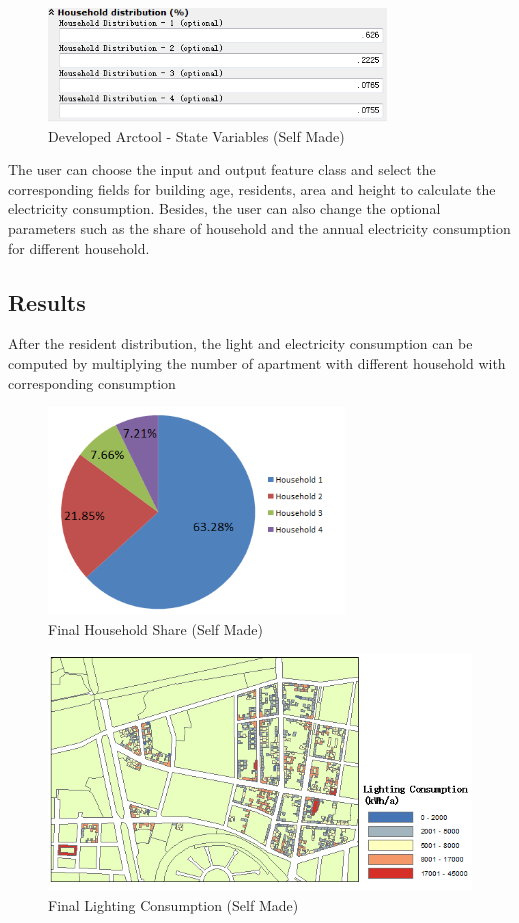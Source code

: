 \documentclass[11pt]{article}
\begin{document}
\begin{figure}[H]
	\centering
	\includegraphics[width=0.8\textwidth]{fig14.png}
	\caption{Developed Arctool - State Variables (Self Made)}
	\label{fig:figure14}
\end{figure}

The user can choose the input and output feature class and select the corresponding fields for building age, residents, area and height to calculate the electricity consumption. Besides, the user can also change the optional parameters such as the share of household and the annual electricity consumption for different household.

\subsection{Results}
After the resident distribution, the light and electricity consumption can be computed by multiplying the number of apartment with different household with corresponding consumption

\begin{figure}[ht]
	\centering
	\includegraphics[width=0.7\textwidth]{fig15.png}
	\caption{Final Household Share (Self Made)}
	\label{fig:figure15}
\end{figure}

\begin{figure}[ht]
	\centering
	\includegraphics[width=1\textwidth]{fig16.png}
	\caption{Final Lighting Consumption (Self Made)}
	\label{fig:figure16}
\end{figure}
\end{document}
